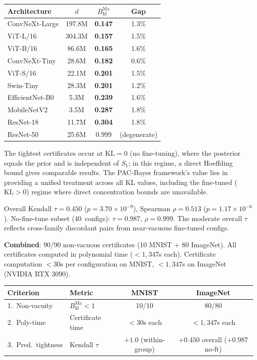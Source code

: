 \documentclass[11pt,a4paper]{article}
\newcommand{\kl}{\mathrm{kl}}
\newcommand{\KL}{\mathrm{KL}}
\begin{document}
\begin{center}
\begin{tabular}{@{}lccc@{}}
\toprule
Architecture & $d$ & $B_{\kl}^{\mathrm{Ma}}$ & Gap \\
\midrule
ConvNeXt-Large & 197.8M & \textbf{0.147} & 1.3\% \\
ViT-L/16 & 304.3M & \textbf{0.157} & 1.5\% \\
ViT-B/16 & 86.6M & \textbf{0.165} & 1.6\% \\
ConvNeXt-Tiny & 28.6M & \textbf{0.182} & 0.6\% \\
ViT-S/16 & 22.1M & \textbf{0.201} & 1.5\% \\
Swin-Tiny & 28.3M & \textbf{0.201} & 1.2\% \\
EfficientNet-B0 & 5.3M & \textbf{0.239} & 1.6\% \\
MobileNetV2 & 3.5M & \textbf{0.287} & 1.8\% \\
ResNet-18 & 11.7M & \textbf{0.304} & 1.8\% \\
ResNet-50 & 25.6M & 0.999 & (degenerate) \\
\bottomrule
\end{tabular}
\end{center}

The tightest certificates occur at $\KL = 0$ (no fine-tuning), where the posterior equals the prior and is independent of $S_1$; in this regime, a direct Hoeffding bound gives comparable results. The PAC-Bayes framework's value lies in providing a unified treatment across all KL values, including the fine-tuned ($\KL > 0$) regime where direct concentration bounds are unavailable.

Overall Kendall $\tau = 0.450$ ($p = 3.70 \times 10^{-9}$), Spearman $\rho = 0.513$ ($p = 1.17 \times 10^{-6}$). No-fine-tune subset (40~configs): $\tau = 0.987$, $\rho = 0.999$. The moderate overall $\tau$ reflects cross-family discordant pairs from near-vacuous fine-tuned configs.

\textbf{Combined}: 90/90 non-vacuous certificates (10 MNIST + 80 ImageNet). All certificates computed in polynomial time ($< 1{,}347$s each). Certificate computation $< 30$s per configuration on MNIST, $< 1{,}347$s on ImageNet (NVIDIA RTX 3090).

\begin{center}
\begin{tabular}{@{}llcc@{}}
\toprule
Criterion & Metric & MNIST & ImageNet \\
\midrule
1.\ Non-vacuity & $B_{\kl}^{\mathrm{Ma}} < 1$ & 10/10 & 80/80 \\
2.\ Poly-time & Certificate time & $< 30$s each & $< 1{,}347$s each \\
3.\ Pred.\ tightness & Kendall $\tau$ & $+1.0$ (within-group) & $+0.450$ overall ($+0.987$ no-ft) \\
\bottomrule
\end{tabular}
\end{center}
\end{document}
